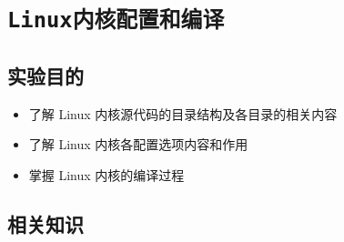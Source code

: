 \chapter{\tt Linux内核配置和编译}
\section{实验目的}
\begin{itemize}\itemsep=-3pt
  \item 了解 Linux 内核源代码的目录结构及各目录的相关内容
  \item 了解 Linux 内核各配置选项内容和作用
  \item 掌握 Linux 内核的编译过程
\end{itemize}

\section{相关知识}
